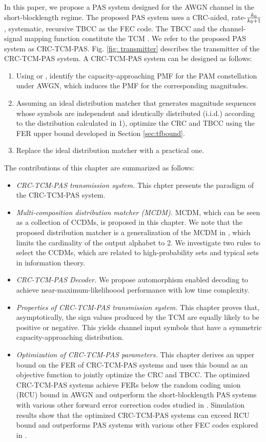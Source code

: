 \documentclass [PhD] {uclathes}
\begin{document}
In this paper, we propose a PAS system designed for the AWGN channel in the short-blocklength regime. The proposed PAS system uses a CRC-aided, rate-$\frac{k_0}{k_0+1}$, systematic, recursive TBCC as the FEC code. The TBCC and the channel-signal mapping function constitute the TCM \cite{ungerboeck1982channel}.  
We refer to the proposed PAS system as CRC-TCM-PAS. Fig. \ref{fig: transmitter} describes the transmitter of the CRC-TCM-PAS  system.
A CRC-TCM-PAS system can be designed as follows:
\begin{enumerate}
    \item Using \cite{Kschischangoptimaldist} or \cite{xiao2021finite}, identify the capacity-approaching PMF for the PAM constellation under AWGN,  which induces the PMF for the corresponding magnitudes.
    \item Assuming an ideal distribution matcher that generates magnitude sequences whose symbols are independent and identically distributed (i.i.d.) according to the distribution calculated in 1), optimize the CRC and TBCC using the FER upper bound developed in Section \ref{sec:tfbound}. 
    \item Replace the ideal distribution matcher with a practical one.
\end{enumerate}
The contributions of this chapter are summarized as follows:
\begin{itemize}
    \item \textit{CRC-TCM-PAS transmission system.} This chpter presents the paradigm of the  CRC-TCM-PAS  system.
    \item \textit{Multi-composition distribution matcher (MCDM).} 
    MCDM, which can be seen as a collection of CCDMs, is proposed in this chapter. We note that the proposed distribution matcher is a generalization of the MCDM in \cite{MCDM}, which limits the cardinality of the output alphabet to 2. We investigate two rules to select the CCDMs, which are related to high-probability sets and typical sets in information theory.
    \item \textit{CRC-TCM-PAS  Decoder.} We propose automorphism enabled decoding \cite{geiselhart2022automorphism} to achieve near-maximum-likelihoood performance with low time complexity.
    \item \textit{Properties of CRC-TCM-PAS transmission system.} This chapter proves that, asymptotically, the sign values produced by the TCM are equally likely to be positive or negative. This yields channel input symbols that have a symmetric capacity-approaching distribution.
    \item \textit{Optimization of CRC-TCM-PAS parameters.} This chapter derives an upper bound on the FER of CRC-TCM-PAS systems and uses this bound as an objective function to jointly optimize the CRC and TBCC. The optimized CRC-TCM-PAS systems achieve FERs below the random coding union (RCU) bound in AWGN and outperform the short-blocklength PAS systems with various other forward error correction codes studied in \cite{cocskun2019efficient}. Simulation results show that the optimized CRC-TCM-PAS systems can exceed RCU bound and outperforms PAS systems with various other FEC codes explored in \cite{cocskun2019efficient}.
\end{itemize}
\end{document}
